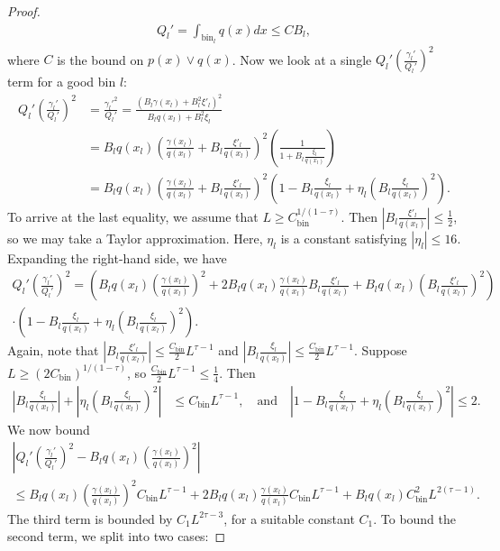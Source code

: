 \documentclass{article}
\newcommand{\bin}{\text{bin}}
\begin{document}
\begin{proof}
\begin{align*}
Q_l' = \int_{\bin_l} q(x) dx \leq C B_l,
\end{align*}
where $C$ is the bound on $p(x) \vee q(x)$. Now we look at a single $Q_l' \left( \frac{\gamma_l'}{Q_l'} \right)^2$ term for a good bin $l$:
\begin{align*}
Q_l' \left( \frac{\gamma_l'}{Q_l'} \right)^2 &= \frac{\gamma_l'^2}{Q_l'} = \frac{ (B_l \gamma(x_l) + B_l^2 \xi'_l)^2}{B_l q(x_l) + B_l^2 \xi_l} \\
   &= B_l q(x_l) \left( \frac{\gamma(x_l)}{q(x_l)} + B_l \frac{\xi'_l}{q(x_l)} \right)^2 
         \left( \frac{1}{1 + B_l \frac{\xi_l}{q(x_l)} } \right) \\
   &=  B_l q(x_l) \left( \frac{\gamma(x_l)}{q(x_l)} + B_l \frac{\xi'_l}{q(x_l)} \right)^2 
         \left( 1 - B_l \frac{\xi_l}{q(x_l)} + \eta_l ( B_l \frac{\xi_l}{q(x_l)} )^2 \right).
\end{align*}
To arrive at the last equality, we assume that $L \geq  C_\bin^{1/(1-\tau)}$. Then $\left| B_l \frac{\xi'_l}{q(x_l)} \right| \leq \frac{1}{2}$, so we may take a Taylor approximation. Here, $\eta_l$ is a constant satisfying $|\eta_l| \leq 16$.
Expanding the right-hand side, we have
\begin{multline*}
Q_l' \left( \frac{\gamma_l'}{Q_l'} \right)^2 = \left( B_l q(x_l) \left( \frac{\gamma(x_l)}{q(x_l)} \right)^2 + 
          2B_l q(x_l) \frac{\gamma(x_l)}{q(x_l)} B_l \frac{\xi'_l}{q(x_l)} +
          B_l q(x_l) \left( B_l \frac{\xi'_l}{q(x_l)} \right)^2 \right) \\
%
\cdot \left( 1 - B_l \frac{\xi_l}{q(x_l)} + \eta_l ( B_l \frac{\xi_l}{q(x_l)} )^2 \right).
\end{multline*}
Again, note that $\left| B_l \frac{\xi'_l}{q(x_l)} \right| \leq \frac{C_\bin}{2} L^{\tau-1}$ and 
$\left| B_l \frac{\xi_l}{q(x_l)} \right| \leq \frac{C_\bin}{2} L^{\tau-1}$. Suppose $L \geq (2C_\bin)^{1/(1-\tau)}$, so $\frac{C_\bin}{2} L^{\tau - 1} \leq \frac{1}{4}$. Then
\begin{align*}
 \left| B_l \frac{\xi_l}{q(x_l)} \right|  + \left| \eta_l ( B_l \frac{\xi_l}{q(x_l)} )^2 \right| &\leq C_\bin L^{\tau - 1}, \quad \text{and} \quad \left| 1 - B_l \frac{\xi_l}{q(x_l)} + \eta_l ( B_l \frac{\xi_l}{q(x_l)} )^2 \right| \leq 2.
\end{align*}
We now bound
\begin{multline*}
\left| Q_l' \left( \frac{\gamma_l'}{Q_l'} \right)^2 
         - B_l q(x_l) \left( \frac{\gamma(x_l)}{q(x_l)} \right)^2 \right| \\
%
\leq B_l q(x_l) \left( \frac{\gamma(x_l)}{q(x_l)} \right)^2 C_\bin L^{\tau - 1} +
       2 B_l q(x_l) \frac{\gamma(x_l)}{q(x_l)}C_\bin  L^{\tau - 1} +
        B_l q(x_l) C_\bin^2 L^{2(\tau-1)}. 
\end{multline*}
The third term is bounded by $C_1 L^{2\tau - 3}$, for a suitable constant $C_1$. To bound the second term, we split into two cases:


\end{proof}
\end{document}
